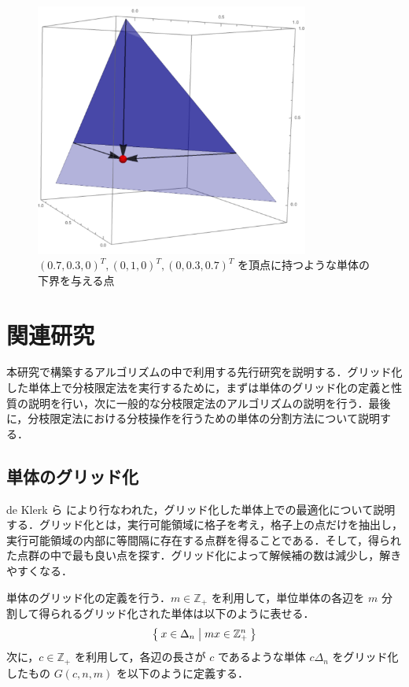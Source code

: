 \documentclass[a4paper,11pt]{jreport}
\begin{document}
\begin{figure}
\begin{center}
\includegraphics[width=9cm]{graphs/lower_bound_of_simplex.pdf}
\caption{$ (0.7, 0.3, 0)^T, (0, 1, 0)^T, (0, 0.3, 0.7)^T $ を頂点に持つような単体の下界を与える点}
\label{fig:lower_bound_of_simplex}
\end{center}
\end{figure}

\chapter{関連研究}

本研究で構築するアルゴリズムの中で利用する先行研究を説明する．グリッド化した単体上で分枝限定法を実行するために，まずは単体のグリッド化の定義と性質の説明を行い，次に一般的な分枝限定法のアルゴリズムの説明を行う．最後に，分枝限定法における分枝操作を行うための単体の分割方法について説明する．

\section{単体のグリッド化} \label{sec:gridize_simplex}

de Klerk ら \cite{deklerk} により行なわれた，グリッド化した単体上での最適化について説明する．グリッド化とは，実行可能領域に格子を考え，格子上の点だけを抽出し，実行可能領域の内部に等間隔に存在する点群を得ることである．そして，得られた点群の中で最も良い点を探す．グリッド化によって解候補の数は減少し，解きやすくなる．\par
単体のグリッド化の定義を行う．$ m \in \mathbb{Z}_+ $ を利用して，単位単体の各辺を $ m $ 分割して得られるグリッド化された単体は以下のように表せる．
$$ \Set{ x \in \Delta_n | mx \in \mathbb{Z}_+^n } $$
次に，$ c \in \mathbb{Z}_+ $ を利用して，各辺の長さが $ c $ であるような単体 $ c \Delta_n $ をグリッド化したもの $ G(c, n, m) $ を以下のように定義する．
\end{document}
